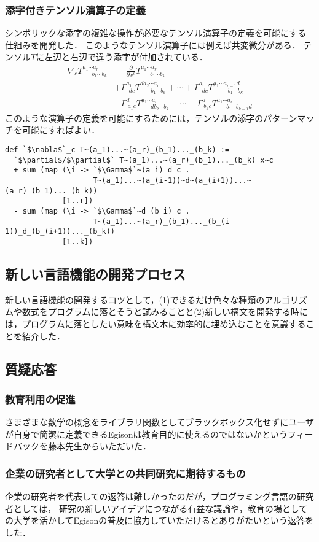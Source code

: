 \documentclass[12pt]{article}
\begin{document}
\subsubsection*{添字付きテンソル演算子の定義}

シンボリックな添字の複雑な操作が必要なテンソル演算子の定義を可能にする仕組みを開発した．
このようなテンソル演算子には例えば共変微分がある．
テンソル$T$に左辺と右辺で違う添字が付加されている．
\begin{equation}
\begin{split}
\nabla_{c} T^{a_{1} \cdots a_{r}}_{\ \ \ \ \ \ \ b_{1} \cdots b_{k}} &=
\frac{\partial}{\partial x^{c}} T^{a_{1} \cdots a_{r}}_{\ \ \ \ \ \ \ b_{1} \cdots b_{k}} \\
& + \Gamma^{a_1}_{\ \ dc} T^{d a_{2} \cdots a_{r}}_{\ \ \ \ \ \ \ \ b_{1} \cdots b_{k}} + \cdots + \Gamma^{a_r}_{\ \ dc} T^{a_{1} \cdots a_{r-1} d}_{\ \ \ \ \ \ \ \ \ \ \ b_{1} \cdots b_{k}} \\
& - \Gamma^{d}_{\ a_{1} c} T^{a_{1} \cdots a_{r}}_{\ \ \ \ \ \ \ d b_{2} \cdots b_{k}} - \cdots - \Gamma^{d}_{\ b_{k} c} T^{a_{1} \cdots a_{r}}_{\ \ \ \ \ \ \ b_{1} \cdots b_{k-1} d} \nonumber
\end{split}
\end{equation}
このような演算子の定義を可能にするためには，テンソルの添字のパターンマッチを可能にすればよい．
\begin{lstlisting}
def `$\nabla$`_c T~(a_1)...~(a_r)_(b_1)..._(b_k) :=
  `$\partial$/$\partial$` T~(a_1)...~(a_r)_(b_1)..._(b_k) x~c
  + sum (map (\i -> `$\Gamma$`~(a_i)_d_c .
                    T~(a_1)...~(a_(i-1))~d~(a_(i+1))...~(a_r)_(b_1)..._(b_k))
             [1..r])
  - sum (map (\i -> `$\Gamma$`~d_(b_i)_c .
                    T~(a_1)...~(a_r)_(b_1)..._(b_(i-1))_d_(b_(i+1))..._(b_k))
             [1..k])
\end{lstlisting}

\subsection*{新しい言語機能の開発プロセス}

新しい言語機能の開発するコツとして，(1)できるだけ色々な種類のアルゴリズムや数式をプログラムに落とそうと試みることと(2)新しい構文を開発する時には，プログラムに落としたい意味を構文木に効率的に埋め込むことを意識することを紹介した．

\subsection*{質疑応答}

\subsubsection*{教育利用の促進}

さまざまな数学の概念をライブラリ関数としてブラックボックス化せずにユーザが自身で簡潔に定義できるEgisonは教育目的に使えるのではないかというフィードバックを藤本先生からいただいた．

\subsubsection*{企業の研究者として大学との共同研究に期待するもの}

企業の研究者を代表しての返答は難しかったのだが，プログラミング言語の研究者としては，
研究の新しいアイデアにつながる有益な議論や，教育の場としての大学を活かしてEgisonの普及に協力していただけるとありがたいという返答をした．
\end{document}
